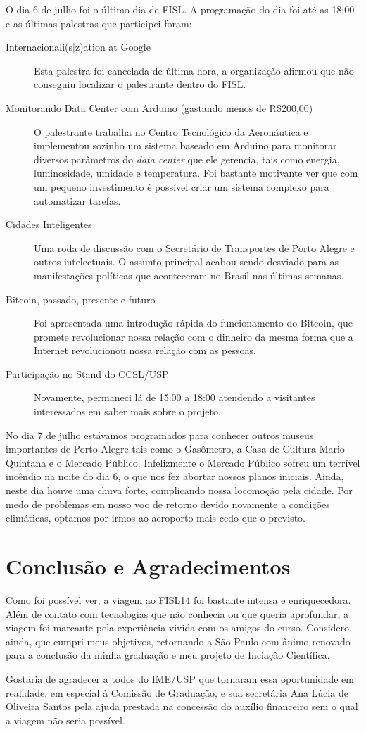 \documentclass{article}
\begin{document}
O dia 6 de julho foi o último dia de FISL. A programação do dia foi até as 18:00 e as últimas palestras que participei foram:

\begin{description}
	\item[Internacionali(s|z)ation at Google] Esta palestra foi cancelada de última hora, a organização afirmou que não conseguiu localizar o palestrante dentro do FISL.
	\item[Monitorando Data Center com Arduino (gastando menos de R\$200,00)] O palestrante trabalha no Centro Tecnológico da Aeronáutica e implementou sozinho um sistema baseado em Arduino para monitorar diversos parâmetros do \emph{data center} que ele gerencia, tais como energia, luminosidade, umidade e temperatura. Foi bastante motivante ver que com um pequeno investimento é possível criar um sistema complexo para automatizar tarefas.
	\item[Cidades Inteligentes] Uma roda de discussão com o Secretário de Transportes de Porto Alegre e outros intelectuais. O assunto principal acabou sendo desviado para as manifestações políticas que aconteceram no Brasil nas últimas semanas.
	\item[Bitcoin, passado, presente e futuro] Foi apresentada uma introdução rápida do funcionamento do Bitcoin, que promete revolucionar nossa relação com o dinheiro da mesma forma que a Internet revolucionou nossa relação com as pessoas.
	\item[Participação no Stand do CCSL/USP] Novamente, permaneci lá de 15:00 a 18:00 atendendo a visitantes interessados em saber mais sobre o projeto.
\end{description}

No dia 7 de julho estávamos programados para conhecer outros museus importantes de Porto Alegre tais como o Gasômetro, a Casa de Cultura Mario Quintana e o Mercado Público. Infelizmente o Mercado Público sofreu um terrível incêndio na noite do dia 6, o que nos fez abortar nossos planos iniciais. Ainda, neste dia houve uma chuva forte, complicando nossa locomoção pela cidade. Por medo de problemas em nosso voo de retorno devido novamente a condições climáticas, optamos por irmos ao aeroporto mais cedo que o previsto.

\section{Conclusão e Agradecimentos}
Como foi possível ver, a viagem ao FISL14 foi bastante intensa e enriquecedora. Além de contato com tecnologias que não conhecia ou que queria aprofundar, a viagem foi marcante pela experiência vivida com os amigos do curso. Considero, ainda, que cumpri meus objetivos, retornando a São Paulo com ânimo renovado para a conclusão da minha graduação e meu projeto de Inciação Científica. 

Gostaria de agradecer a todos do IME/USP que tornaram essa oportunidade em realidade, em especial à Comissão de Graduação, e sua secretária Ana Lúcia de Oliveira Santos pela ajuda prestada na concessão do auxílio financeiro sem o qual a viagem não seria possível.


%
%
\end{document}
